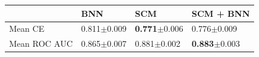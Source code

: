 \begin{tabular}{llll}
\toprule
     &            BNN &            SCM &      SCM + BNN \\
\midrule
Mean CE     &  0.811$\pm$0.009 &  \textbf{0.771}$\pm$0.006 &  0.776$\pm$0.009 \\
Mean ROC AUC &  0.865$\pm$0.007 &  0.881$\pm$0.002 & \textbf{0.883}$\pm$0.003 \\
\bottomrule
\end{tabular}
